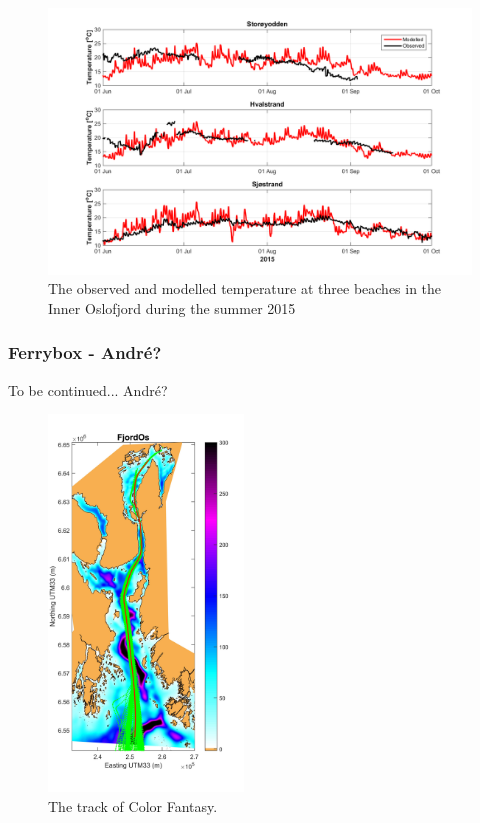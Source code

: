 \begin{figure}[ht]
\centerline{
\includegraphics*[trim=0 0 0 0,clip=true,width=\textwidth]{Figurer/badetemp_2015}
}
\caption{\small
The observed and modelled temperature at three beaches in the Inner Oslofjord during the summer 2015}
\label{fig:badetemp_2015}
\end{figure}


\subsubsection{Ferrybox - Andr\'{e}?}
To be continued... Andr\'{e}?

\begin{figure}[ht]
\centerline{
\includegraphics*[trim=1cm 0cm 1cm 0cm,clip=true,height=10cm]{Figurer/FjordOs_with_FA_track}}
\caption{\small
The track of Color Fantasy.}
\label{fig:Ferrybox_track}
\end{figure}

